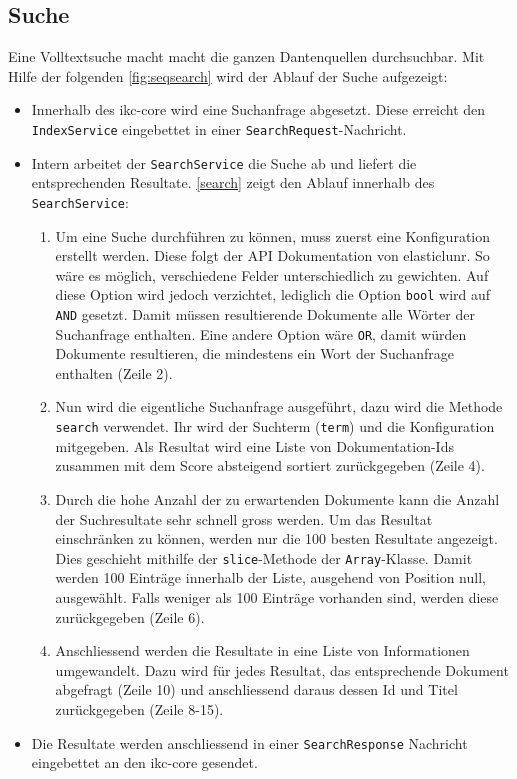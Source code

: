 
\subsection{Suche}


Eine Volltextsuche macht macht die ganzen Dantenquellen durchsuchbar. Mit Hilfe der folgenden \autoref{fig:seqsearch} wird der Ablauf der Suche aufgezeigt:
\begin{itemize}
    \item Innerhalb des \gls{ikc-core} wird eine Suchanfrage abgesetzt. Diese erreicht den \texttt{IndexService} eingebettet in einer \texttt{SearchRequest}-Nachricht. 
    \item Intern arbeitet der \texttt{SearchService} die Suche ab und liefert die entsprechenden Resultate. \autoref{search} zeigt den Ablauf innerhalb des \texttt{SearchService}:
    \begin{enumerate}
        \item Um eine Suche durchführen zu können, muss zuerst eine Konfiguration erstellt werden. Diese folgt der API Dokumentation von \gls{elasticlunr}. So wäre es möglich, verschiedene Felder unterschiedlich zu gewichten. Auf diese Option wird jedoch verzichtet, lediglich die Option \texttt{bool} wird auf \texttt{AND} gesetzt. Damit müssen resultierende Dokumente alle Wörter der Suchanfrage enthalten. Eine andere Option wäre \texttt{OR}, damit würden Dokumente resultieren, die mindestens ein Wort der Suchanfrage enthalten (Zeile 2).
        \item Nun wird die eigentliche Suchanfrage ausgeführt, dazu wird die Methode \texttt{search} verwendet. Ihr wird der Suchterm (\texttt{term}) und die Konfiguration mitgegeben. Als Resultat wird eine Liste von Dokumentation-Ids zusammen mit dem \gls{Score} absteigend sortiert zurückgegeben (Zeile 4).
        \item Durch die hohe Anzahl der zu erwartenden Dokumente kann die Anzahl der Suchresultate sehr schnell gross werden. Um das Resultat einschränken zu können, werden nur die 100 besten Resultate angezeigt. Dies geschieht mithilfe der \texttt{slice}-Methode der \texttt{Array}-Klasse. Damit werden 100 Einträge innerhalb der Liste, ausgehend von Position null, ausgewählt. Falls weniger als 100 Einträge vorhanden sind, werden diese zurückgegeben (Zeile 6).
        \item Anschliessend werden die Resultate in eine Liste von Informationen umgewandelt. Dazu wird für jedes Resultat, das entsprechende Dokument abgefragt (Zeile 10) und anschliessend daraus dessen Id und Titel zurückgegeben (Zeile 8-15).
    \end{enumerate}
    \item Die Resultate werden anschliessend in einer \texttt{SearchResponse} Nachricht eingebettet an den \gls{ikc-core} gesendet.
\end{itemize}

